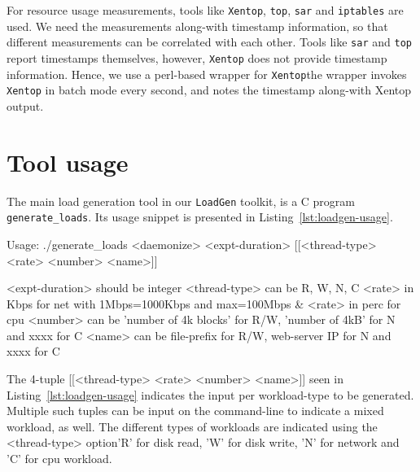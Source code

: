 For resource usage measurements, tools like \texttt{Xentop}, \texttt{top},
\texttt{sar} and \texttt{iptables} are used. We need the measurements along-with
timestamp information, so that different measurements can be correlated with
each other. Tools like \texttt{sar} and \texttt{top} report timestamps themselves,
however, \texttt{Xentop} does not provide timestamp information. Hence, we use
a perl-based wrapper for \texttt{Xentop}\textemdash{}the wrapper invokes \texttt{Xentop}
in batch mode every second, and notes the timestamp along-with Xentop output.

\section{Tool usage}
The main load generation tool in our \texttt{LoadGen} toolkit, 
is a C program \texttt{generate\_loads}. Its usage snippet is presented 
in Listing~\ref{lst:loadgen-usage}.

\begin{snippet}
Usage: ./generate_loads <daemonize> <expt-duration> [[<thread-type> <rate> <number> <name>]]

<expt-duration> should be integer
<thread-type> can be R, W, N, C
<rate> in Kbps for net with 1Mbps=1000Kbps and max=100Mbps & <rate> in perc for cpu
<number> can be 'number of 4k blocks' for R/W, 'number of 4kB' for N and xxxx for C
<name> can be file-prefix for R/W, web-server IP for N and xxxx for C
\end{snippet}

The 4-tuple [[<thread-type> <rate> <number> <name>]] seen in Listing~\ref{lst:loadgen-usage}
indicates the input per workload-type to be generated. Multiple such tuples can be input
on the command-line to indicate a mixed workload, as well. The different types of workloads
are indicated using the <thread-type> option\textemdash{}'R' for disk read, 'W' for disk write, 
'N' for network and 'C' for cpu workload. 
